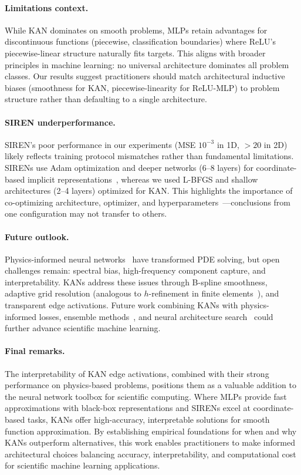 \documentclass[11pt,a4paper]{article}
\begin{document}
\paragraph{Limitations context.} While KAN dominates on smooth problems, MLPs retain advantages for discontinuous functions (piecewise, classification boundaries) where ReLU's piecewise-linear structure naturally fits targets. This aligns with broader principles in machine learning: no universal architecture dominates all problem classes. Our results suggest practitioners should match architectural inductive biases (smoothness for KAN, piecewise-linearity for ReLU-MLP) to problem structure rather than defaulting to a single architecture.

\paragraph{SIREN underperformance.} SIREN's poor performance in our experiments (MSE $10^{-3}$ in 1D, $>20$ in 2D) likely reflects training protocol mismatches rather than fundamental limitations. SIRENs use Adam optimization and deeper networks (6--8 layers) for coordinate-based implicit representations~\citep{sitzmann2020implicit}, whereas we used L-BFGS and shallow architectures (2--4 layers) optimized for KAN. This highlights the importance of co-optimizing architecture, optimizer, and hyperparameters~\citep{krishnapriyan2021characterizing}—conclusions from one configuration may not transfer to others.

\paragraph{Future outlook.} Physics-informed neural networks~\citep{raissi2019physics} have transformed PDE solving, but open challenges remain: spectral bias, high-frequency component capture, and interpretability. KANs address these issues through B-spline smoothness, adaptive grid resolution (analogous to $h$-refinement in finite elements~\citep{huang2011adaptive}), and transparent edge activations. Future work combining KANs with physics-informed losses, ensemble methods~\citep{jaderberg2017population, dietterich2000ensemble}, and neural architecture search~\citep{zoph2017neural} could further advance scientific machine learning.

\paragraph{Final remarks.} The interpretability of KAN edge activations, combined with their strong performance on physics-based problems, positions them as a valuable addition to the neural network toolbox for scientific computing. Where MLPs provide fast approximations with black-box representations and SIRENs excel at coordinate-based tasks, KANs offer high-accuracy, interpretable solutions for smooth function approximation. By establishing empirical foundations for when and why KANs outperform alternatives, this work enables practitioners to make informed architectural choices balancing accuracy, interpretability, and computational cost for scientific machine learning applications.
\end{document}
